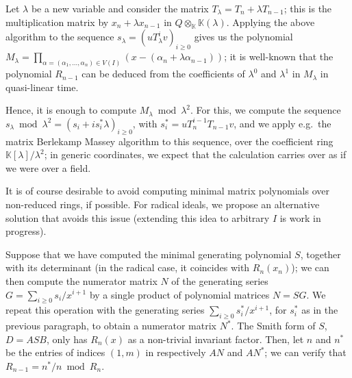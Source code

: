 \documentclass[12pt]{article}
\begin{document}
Let $\lambda$ be a new variable and consider the matrix $T_\lambda=T_n
+ \lambda T_{n-1}$; this is the multiplication matrix by $x_n +
\lambda x_{n-1}$ in $Q \otimes_{\mathbb{K}}
\mathbb{K}(\lambda)$. Applying the above algorithm to the sequence
$s_\lambda=(uT_\lambda^iv)_{i \ge 0}$ gives us the polynomial
$M_\lambda=\prod_{\alpha=(\alpha_1,\dots,\alpha_n) \in V(I)}
(x-(\alpha_n+\lambda \alpha_{n-1}))$; it is well-known that the
polynomial $R_{n-1}$ can be deduced from the coefficients of
$\lambda^0$ and $\lambda^1$ in $M_\lambda$ in quasi-linear time.

Hence, it is enough to compute $M_\lambda \bmod \lambda^2$. For this,
we compute the sequence $s_\lambda \bmod \lambda^2=(s_i + i s^*_i \lambda)_{i \ge 0}$,
with $s^*_i= uT_n^{i-1} T_{n-1}v$, and we apply e.g.\ the matrix
Berlekamp Massey algorithm to this sequence, over the coefficient ring
$\mathbb{K}[\lambda]/\lambda^2$; in generic coordinates, we expect that
the calculation carries over as if we were over a field.

\medskip{} It is of course desirable to 
avoid computing minimal matrix polynomials over non-reduced rings, if
possible. For radical ideals, we propose an alternative solution that
avoids this issue (extending this idea to arbitrary $I$ is work in progress).

Suppose that we have computed the minimal generating polynomial $S$,
together with its determinant (in the radical case, it coincides with
$R_n(x_n)$); we can then compute the numerator matrix $N$ of the
generating series $G=\sum_{i \ge 0} s_i/x^{i+1}$ by a single product
of polynomial matrices $N=S G$. We repeat this operation with the
generating series $\sum_{i \ge 0} s^*_i/x^{i+1}$, for $s^*_i$ as in
the previous paragraph, to obtain a numerator matrix $N^*$. The Smith
form of $S$, $D=A S B$, only has $R_n(x)$ as a non-trivial
invariant factor. Then, let $n$ and $n^*$ be the entries of indices
$(1,m)$ in respectively $AN$ and $AN^*$; we can verify that
$R_{n-1}=n^*/n \bmod R_n$.
\end{document}
